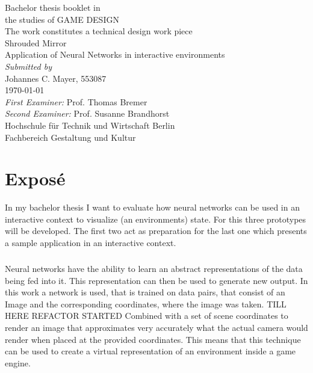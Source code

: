 \documentclass[a4paper, twoside, 10pt]{report}
\begin{document}
\begin{center}
\begin{spacing}{1.5}
{\Large
Bachelor thesis booklet in \\ the studies of GAME DESIGN \\
\vspace*{\fill}
The work constitutes a technical design work piece \\
\vspace*{\fill}
{\huge Shrouded Mirror} \\
Application of Neural Networks in interactive environments \\
\vspace*{\fill}
\textit{Submitted by} \\
Johannes C. Mayer, 553087 \\
\today \\
\vspace*{\fill}
\textit{First Examiner:} Prof. Thomas Bremer \\
\textit{Second Examiner:} Prof. Susanne Brandhorst \\
\vspace*{\fill}
Hochschule f\"ur Technik und Wirtschaft Berlin \\
Fachbereich Gestaltung und Kultur \\
}
\end{spacing}
\end{center}

\chapter*{Expos\'e}
In my bachelor thesis I want to evaluate how neural networks can be used in an interactive context to visualize (an environments) state. For this three prototypes will be developed. The first two act as preparation for the last one which presents a sample application in an interactive context.

\paragraph{}
Neural networks have the ability to learn an abstract representations of the data being fed into it. This representation can then be used to generate new output. In this work a network is used, that is trained on data pairs, that consist of an Image and the corresponding coordinates, where the image was taken. {\color{red}TILL HERE REFACTOR STARTED} Combined with a set of scene coordinates to render an image that approximates very accurately what the actual camera would render when placed at the provided coordinates. This means that this technique can be used to create a virtual representation of an environment inside a game engine. 
\end{document}

